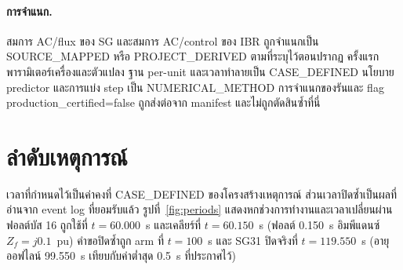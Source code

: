 \documentclass[12pt,a4paper]{article}
\newcommand{\code}[1]{{\ttfamily\small\hyphenchar\font=-1 #1}}
\begin{document}
\paragraph{การจำแนก.}
สมการ AC/flux ของ SG และสมการ AC/control ของ IBR ถูกจำแนกเป็น
\textsf{SOURCE\_MAPPED} หรือ \textsf{PROJECT\_DERIVED} ตามที่ระบุไว้ตอนปรากฏ
ครั้งแรก พารามิเตอร์เครื่องและตัวแปลง ฐาน per-unit และเวลาทำลายเป็น
\textsf{CASE\_DEFINED} นโยบาย predictor และการแบ่ง step เป็น
\textsf{NUMERICAL\_METHOD} การจำแนกของรันและ flag \code{production\_certified=false}
ถูกส่งต่อจาก manifest และไม่ถูกตัดสินซ้ำที่นี่

\section{ลำดับเหตุการณ์}\label{sec:chrono}
เวลาที่กำหนดไว้เป็นค่าคงที่ \textsf{CASE\_DEFINED} ของโครงสร้างเหตุการณ์
ส่วนเวลาปิดซ้ำเป็นผลที่อ่านจาก event log ที่ยอมรับแล้ว
รูปที่~\ref{fig:periods} แสดงหกช่วงการทำงานและเวลาเปลี่ยนผ่าน
ฟอลต์บัส 16 ถูกใช้ที่ $t=60.000$~s และเคลียร์ที่ $t=60.150$~s
(ฟอลต์ 0.150~s อิมพีแดนซ์ $Z_f=j0.1$~pu) คำขอปิดซ้ำถูก arm ที่ $t=100$~s
และ SG31 ปิดจริงที่ $t=119.550$~s (อายุออฟไลน์ 99.550~s เทียบกับค่าต่ำสุด
0.5~s ที่ประกาศไว้)
\end{document}
